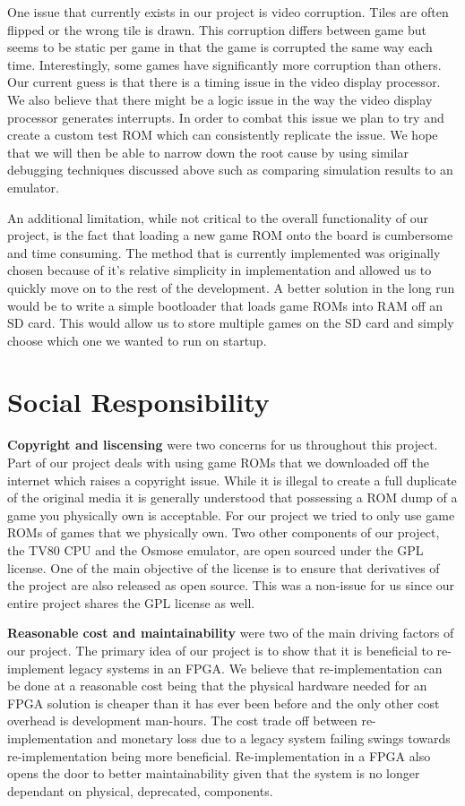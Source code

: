 \documentclass{article}
\begin{document}
One issue that currently exists in our project is video corruption. Tiles are
often flipped or the wrong tile is drawn. This corruption differs between game
but seems to be static per game in that the game is corrupted the same way each
time. Interestingly, some games have significantly more corruption than others.
Our current guess is that there is a timing issue in the video display
processor. We also believe that there might be a logic issue in the way the
video display processor generates interrupts. In order to combat this issue we
plan to try and create a custom test ROM which can consistently replicate the
issue.  We hope that we will then be able to narrow down the root cause by
using similar debugging techniques discussed above such as comparing simulation
results to an emulator.

An additional limitation, while not critical to the overall functionality of
our project, is the fact that loading a new game ROM onto the board is
cumbersome and time consuming. The method that is currently implemented was
originally chosen because of it's relative simplicity in implementation and
allowed us to quickly move on to the rest of the development.  A better
solution in the long run would be to write a simple bootloader that loads game
ROMs into RAM off an SD card. This would allow us to store multiple games on
the SD card and simply choose which one we wanted to run on startup.

\section{Social Responsibility}

\textbf{Copyright and liscensing} were two concerns for us throughout this
project.  Part of our project deals with using game ROMs that we downloaded off
the internet which raises a copyright issue. While it is illegal to create a
full duplicate of the original media it is generally understood that possessing
a ROM dump of a game you physically own is acceptable. For our project we tried
to only use game ROMs of games that we physically own. Two other components of
our project, the TV80 CPU and the Osmose emulator, are open sourced under the
GPL license. One of the main objective of the license is to ensure that
derivatives of the project are also released as open source. This was a
non-issue for us since our entire project shares the GPL license as well.

\textbf{Reasonable cost and maintainability} were two of the main driving
factors of our project. The primary idea of our project is to show that it is
beneficial to re-implement legacy systems in an FPGA. We believe that
re-implementation can be done at a reasonable cost being that the physical
hardware needed for an FPGA solution is cheaper than it has ever been before
and the only other cost overhead is development man-hours. The cost trade off
between re-implementation and monetary loss due to a legacy system failing
swings towards re-implementation being more beneficial. Re-implementation in a
FPGA also opens the door to better maintainability given that the system is no
longer dependant on physical, deprecated, components.
\end{document}
